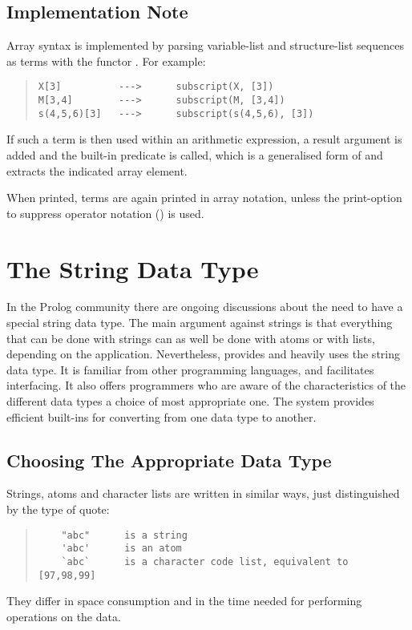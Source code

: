 \subsection{Implementation Note}

Array syntax is implemented by parsing variable-list and
structure-list sequences as terms with the functor .
For example:
\begin{quote}
\begin{verbatim}
X[3]          --->      subscript(X, [3])
M[3,4]        --->      subscript(M, [3,4])
s(4,5,6)[3]   --->      subscript(s(4,5,6), [3])
\end{verbatim}
\end{quote}
If such a term is then used within an arithmetic expression,
a result argument is added and the built-in predicate
is called, which is a generalised form of
and extracts the indicated array element.

When printed,  terms are again printed in array notation,
unless the print-option to suppress operator notation () is used.


\section{The String Data Type}
\label{chapstring}

In the Prolog community there are ongoing discussions about the need
to have a special string data type.
The main argument against strings is that everything that can be done
with strings can as well be done with atoms or with lists, depending
on the application.
Nevertheless, {\eclipse} provides and heavily uses the string data type.
It is familiar from other programming languages, and facilitates interfacing.
It also offers programmers who are aware of the characteristics
of the different data types a choice of most appropriate one.
The system provides efficient built-ins for converting from one data
type to another.

\subsection{Choosing The Appropriate Data Type}
Strings, atoms and character lists are written in similar ways,
just distinguished by the type of quote:
\begin{quote}
\begin{verbatim}
    "abc"      is a string
    'abc'      is an atom
    `abc`      is a character code list, equivalent to [97,98,99]
\end{verbatim}
\end{quote}
They differ in space consumption and in
the time needed for performing operations on the data.

